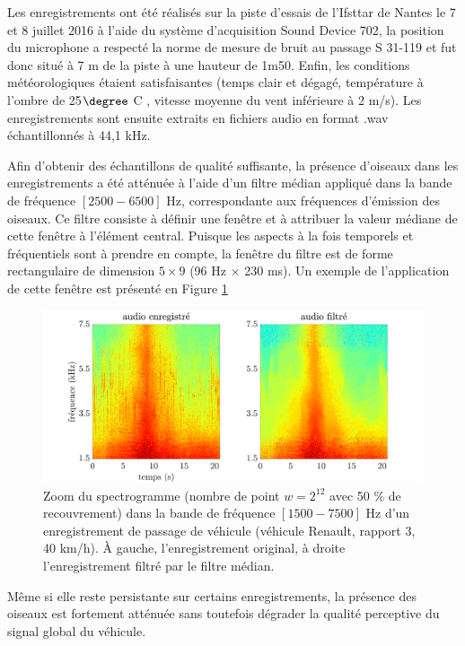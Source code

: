 Les enregistrements ont été réalisés sur la piste d'essais de l'Ifsttar de Nantes le 7 et 8 juillet 2016 à l'aide du système d'acquisition Sound Device 702, la position du microphone a respecté la norme de mesure de bruit au passage S 31-119 et fut donc situé à 7 m de la piste à une hauteur de 1m50. Enfin, les conditions météorologiques étaient satisfaisantes (temps clair et dégagé, température à l'ombre de 25$\degree$ C , vitesse moyenne du vent inférieure à 2 m/s). Les enregistrements sont ensuite extraits en fichiers audio en format .wav échantillonnés à 44,1 kHz.

Afin d'obtenir des échantillons de qualité suffisante, la présence d'oiseaux dans les enregistrements a été atténuée à l'aide d'un filtre médian \cite{fitzgerald_harmonic/percussive_2010} appliqué dans la bande de fréquence $\left[2500 - 6500\right]$ Hz, correspondante aux fréquences d'émission des oiseaux. Ce filtre consiste à définir une fenêtre et à attribuer la valeur médiane de cette fenêtre à l'élément central. Puisque les aspects à la fois temporels et fréquentiels sont à prendre en compte, la fenêtre du filtre est de forme rectangulaire de dimension $5 \times 9$ (96 Hz $\times$ 230 ms). Un exemple de l'application de cette fenêtre est présenté en Figure \ref{fig:filtre_median}\\

\begin{figure}[t]
\centering
\includegraphics[width=.9\textwidth]{./figures/autres/filtrageMedian_VL1_R3_40_FR.pdf}
\caption{Zoom du spectrogramme (nombre de point $w = 2^{12}$ avec 50 $\%$ de recouvrement) dans la bande de fréquence $\left[1500-7500 \right]$ Hz d'un enregistrement de passage de véhicule (véhicule Renault, rapport 3, 40 km/h). \`A gauche, l'enregistrement original, à droite l'enregistrement filtré par le filtre médian.}
\label{fig:filtre_median}
\end{figure}


Même si elle reste persistante sur certains enregistrements, la présence des oiseaux est fortement atténuée sans toutefois dégrader la qualité perceptive du signal global du véhicule.\\

